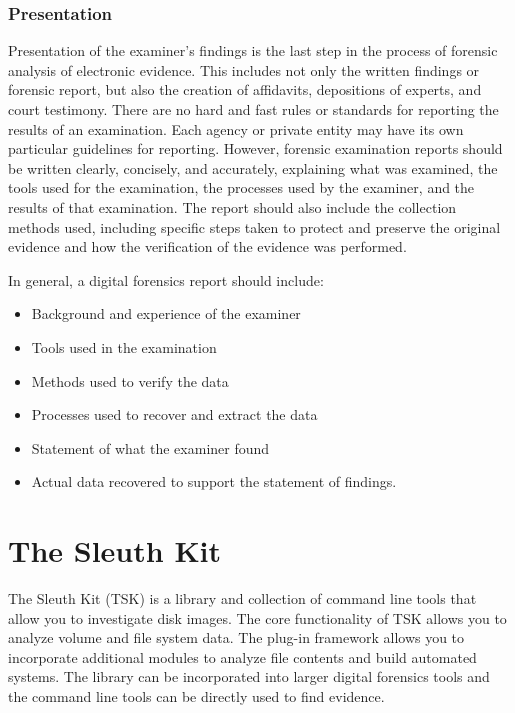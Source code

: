 \subsubsection{Presentation}

Presentation of the examiner's findings is the last step in the process of forensic
analysis of electronic evidence. This includes not only the written findings or forensic
report, but also the creation of affidavits, depositions of experts, and court testimony.
There are no hard and fast rules or standards for reporting the results of an
examination. Each agency or private entity may have its own particular guidelines
for reporting. However, forensic examination reports should be written clearly, concisely,
and accurately, explaining what was examined, the tools used for the examination,
the processes used by the examiner, and the results of that examination.
The report should also include the collection methods used, including specific steps
taken to protect and preserve the original evidence and how the verification of the
evidence was performed.

In general, a digital forensics report should include:

\begin{itemize}
\item Background and experience of the examiner
\item Tools used in the examination
\item Methods used to verify the data
\item Processes used to recover and extract the data
\item Statement of what the examiner found
\item Actual data recovered to support the statement of findings.
\end{itemize}

\section{The Sleuth Kit}

The Sleuth Kit (TSK) is a library and collection of command line tools that allow
you to investigate disk images. The core functionality of TSK allows you to analyze
volume and file system data. The plug-in framework allows you to incorporate
additional modules to analyze file contents and build automated systems. The
library can be incorporated into larger digital forensics tools and the command
line tools can be directly used to find evidence.

